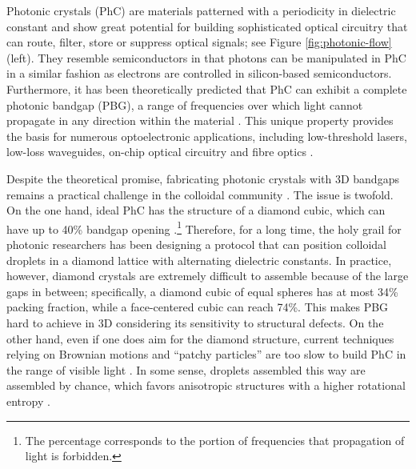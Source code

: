 Photonic crystals (PhC) are materials patterned with a periodicity in dielectric constant and show great potential for building sophisticated optical circuitry that can route, filter, store or suppress optical signals; see Figure \ref{fig:photonic-flow} (left).
They resemble semiconductors in that photons can be manipulated in PhC in a similar fashion as electrons are controlled in silicon-based semiconductors.
Furthermore, it has been theoretically predicted that PhC can exhibit a complete photonic bandgap (PBG), \ie a range of frequencies over which light cannot propagate in any direction within the material \citep{Yablonovitch1987}.
This unique property provides the basis for numerous optoelectronic applications, including low-threshold lasers, low-loss waveguides, on-chip optical circuitry and fibre optics \citep{Meade_etal_1994, Joannopoulos_etal_1997, Rinne_etal_2008}.

Despite the theoretical promise, fabricating photonic crystals with 3D bandgaps remains a practical challenge in the colloidal community \citep{Velev_etal_AM2009, Sacanna_etal_COCIS2011, Shen_AS_2016}.
The issue is twofold.
On the one hand, ideal PhC has the structure of a diamond cubic, which can have up to 40\% bandgap opening \citep{PRL1990}.\footnote{The percentage corresponds to the portion of frequencies that propagation of light is forbidden.}
Therefore, for a long time, the holy grail for photonic researchers has been designing a protocol that can position colloidal droplets in a diamond lattice with alternating dielectric constants.
In practice, however, diamond crystals are extremely difficult to assemble because of the large gaps in between; specifically, a diamond cubic of equal spheres has at most 34\% packing fraction, while a face-centered cubic can reach 74\%. This makes PBG hard to achieve in 3D considering its sensitivity to structural defects.
On the other hand, even if one does aim for the diamond structure, current techniques relying on Brownian motions and ``patchy particles'' are too slow to build PhC in the range of visible light \citep{Yi_etal_CM2013}. In some sense, droplets assembled this way are assembled by chance, which favors anisotropic structures with a higher rotational entropy \citep{Meng2010}.

